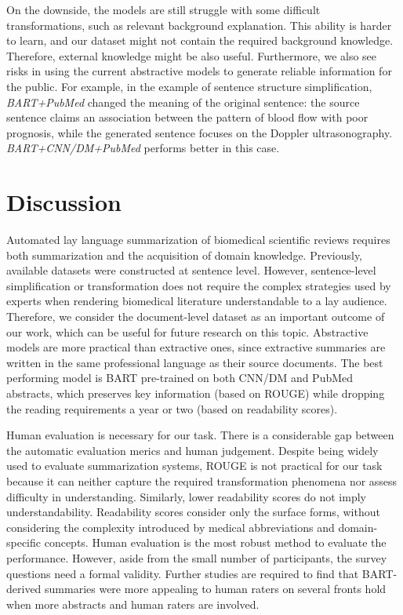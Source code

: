 \documentclass[letterpaper, table]{article} %
\begin{document}
On the downside, the  models are still struggle with some difficult transformations, such as relevant background explanation. This ability is harder to learn, and our dataset might not contain the required background knowledge.
Therefore, external knowledge might be also useful.
Furthermore, we also see risks in using the current abstractive models to generate reliable information for the public. For example, in the example of sentence structure simplification, \textit{BART+PubMed} changed the meaning of the original sentence: the source sentence claims an association between the pattern of blood flow with poor prognosis, while the generated sentence focuses on the Doppler ultrasonography. \textit{BART+CNN/DM+PubMed}
performs better in this case.












\section{Discussion}
Automated lay language summarization of biomedical scientific reviews requires both summarization and the acquisition of domain knowledge.
Previously, available datasets
were constructed at sentence level. However, sentence-level simplification or transformation does not require the complex strategies used by experts when rendering biomedical literature understandable to a lay audience. Therefore, we consider the
document-level dataset as an important outcome of our work,  which
can be useful for future research on this topic.
Abstractive models are more practical than extractive ones,
since extractive summaries
are written
in the same professional language as their source documents.
The best performing model is BART pre-trained on both CNN/DM and PubMed abstracts, which preserves key information (based on ROUGE) while dropping the reading requirements a year or two (based on readability scores).

Human evaluation is necessary for our task.
There is a considerable gap between the automatic evaluation merics
and human judgement.
Despite being widely used to evaluate summarization systems, ROUGE is not practical for our task because it can neither capture the required transformation phenomena nor assess difficulty in understanding.
Similarly, lower readability scores do not imply understandability.
Readability scores consider only the surface forms,
without considering the complexity introduced by medical abbreviations and domain-specific concepts.
Human evaluation is the most robust method to evaluate the performance.
However, aside from the small number of participants,
the survey questions need a formal validity.
Further studies are required to find that BART-derived summaries were more appealing to human raters on several fronts hold when more abstracts and human raters are involved.
\end{document}

